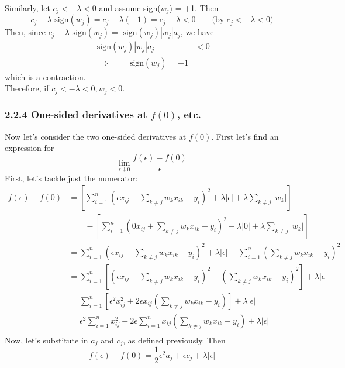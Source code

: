 \documentclass[paper=a4, fontsize=11pt]{scrartcl} %
\numberwithin{equation}{section} %
\numberwithin{figure}{section} %
\numberwithin{table}{section} %
\begin{document}
Similarly, let $c_j < - \lambda < 0 $ and assume sign($w_j$) = +1. Then
\[c_j - \lambda \textrm{ sign}(w_j) = c_j - \lambda (+1)  = c_j - \lambda < 0 \qquad \textrm{(by } c_j < - \lambda < 0 )\]
Then, since $c_j - \lambda \textrm{ sign}(w_j) =  \textrm{ sign}(w_j) |w_j| a _j $, we have
\begin{align*}
\textrm{ sign}(w_j) |w_j| a _j &<0 \\
\implies \qquad{} \textrm{ sign}(w_j) = -1
\end{align*}
which is a contraction.\\

Therefore, if $c_j < - \lambda < 0, w_j <0$.

\subsubsection*{2.2.4 One-sided derivatives at $f(0)$, etc.}

Now let's consider the two one-sided derivatives at $f(0)$. First let's find an expression for
\[\lim_{\epsilon \downarrow 0} \frac{f(\epsilon) - f(0)}{\epsilon}\]
First, let's tackle just the numerator:
\begin{align*}
f(\epsilon) - f(0) &= \left[ \sum_{i = 1}^n \left(\epsilon x_{ij} + \sum_{k \ne j} w_k x_{ik} - y_i\right)^2 + \lambda |\epsilon| + \lambda \sum_{k\ne j}|w_k| \right] \\
&\qquad{} - \left[ \sum_{i = 1}^n \left(0 x_{ij} + \sum_{k \ne j} w_k x_{ik} - y_i\right)^2 + \lambda |0| + \lambda \sum_{k\ne j}|w_k|\right] \\
&= \sum_{i = 1}^n \left(\epsilon x_{ij} + \sum_{k \ne j} w_k x_{ik} - y_i\right)^2 + \lambda |\epsilon| - \sum_{i = 1}^n \left( \sum_{k \ne j} w_k x_{ik} - y_i\right)^2 \\
&= \sum_{i = 1}^n \left[ \left(\epsilon x_{ij} + \sum_{k \ne j} w_k x_{ik} - y_i\right)^2 - \left( \sum_{k \ne j} w_k x_{ik} - y_i\right)^2 \right] + \lambda |\epsilon| \\
&= \sum_{i = 1}^n \left[ \epsilon^2 x_{ij}^2 + 2\epsilon x_{ij} \left(\sum_{k \ne j} w_k x_{ik} - y_i\right)  \right] + \lambda |\epsilon| \\
&= \epsilon^2  \sum_{i = 1}^n x_{ij}^2 + 2\epsilon \sum_{i = 1}^n x_{ij} \left(\sum_{k \ne j} w_k x_{ik} - y_i\right) + \lambda |\epsilon| \\
\end{align*}
Now, let's substitute in $a_j$ and $c_j$, as defined previously. Then
\[f(\epsilon) - f(0) = \frac{1}{2}\epsilon^2 a_j + \epsilon c_j + \lambda |\epsilon|\]
\end{document}
